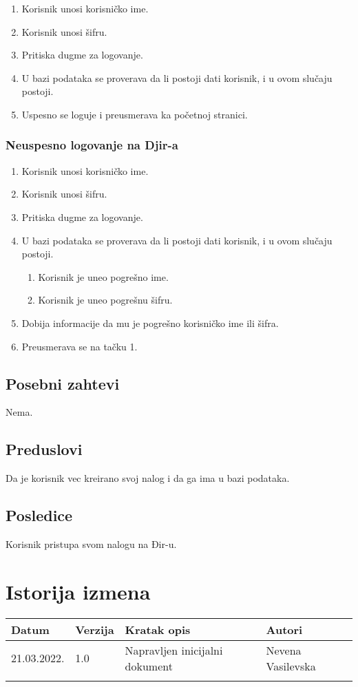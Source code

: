 \documentclass[12pt]{article}
\begin{document}
\begin{enumerate}
    \item Korisnik unosi korisničko ime.
    \item Korisnik unosi šifru.
    \item Pritiska dugme za logovanje.
    \item U bazi podataka se proverava da li postoji dati korisnik, i u ovom slučaju postoji.
    \item Uspesno se loguje i preusmerava ka početnoj stranici.
\end{enumerate}

\subsubsection{Neuspesno logovanje na Djir-a}

\begin{enumerate}
    \item Korisnik unosi korisničko ime.
    \item Korisnik unosi šifru.
    \item Pritiska dugme za logovanje.
    \item U bazi podataka se proverava da li postoji dati korisnik, i u ovom slučaju postoji.
    \begin{enumerate}
    \item Korisnik je uneo pogrešno ime.
    \item Korisnik je uneo pogrešnu šifru.
    \end{enumerate}
    \item Dobija informacije da mu je pogrešno korisničko ime ili šifra.
    \item Preusmerava se na tačku 1.
\end{enumerate}

\subsection{Posebni zahtevi}
Nema.
\subsection{Preduslovi}
Da je korisnik vec kreirano svoj nalog i da ga ima u bazi podataka.
\subsection{Posledice}
Korisnik pristupa svom nalogu na Đir-u.

\section{Istorija izmena}
\begin{center}
\begin{tabular}{ | m{2cm} | m{1.5cm}| m{6cm} | m{5cm} | } 
\hline
Datum & Verzija & Kratak opis & Autori \\ 
\hline
 21.03.2022. & 1.0 & Napravljen inicijalni dokument & Nevena Vasilevska\\ 
\hline
&&&\\ 
\hline
\end{tabular}
\end{center}
\end{document}
